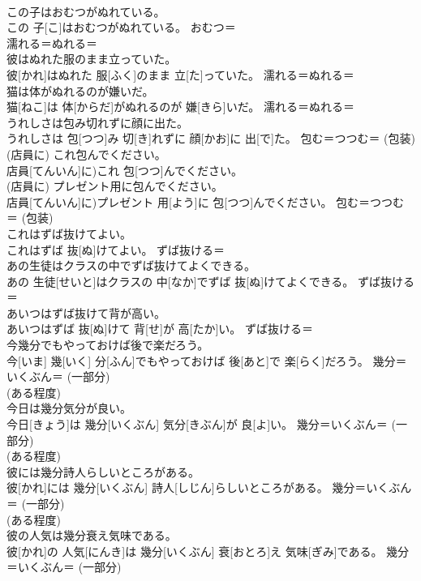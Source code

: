 \documentclass[8pt]{extreport}
\begin{document}
\begin{CJK}{UTF8}{min}
\\	この子はおむつがぬれている。	
\\	この 子[こ]はおむつがぬれている。	おむつ＝ 
\\	濡れる＝ぬれる＝ 
\\	彼はぬれた服のまま立っていた。	
\\	彼[かれ]はぬれた 服[ふく]のまま 立[た]っていた。	濡れる＝ぬれる＝ 
\\	猫は体がぬれるのが嫌いだ。	
\\	猫[ねこ]は 体[からだ]がぬれるのが 嫌[きら]いだ。	濡れる＝ぬれる＝ 
\\	うれしさは包み切れずに顔に出た。	
\\	うれしさは 包[つつ]み 切[き]れずに 顔[かお]に 出[で]た。	包む＝つつむ＝ (包装) 
\\	(店員に) これ包んでください。	
\\	店員[てんいん]に)これ 包[つつ]んでください。	
\\	(店員に) プレゼント用に包んでください。	
\\	店員[てんいん]に)プレゼント 用[よう]に 包[つつ]んでください。	包む＝つつむ＝ (包装) 
\\	これはずば抜けてよい。	
\\	これはずば 抜[ぬ]けてよい。	ずば抜ける＝ 
\\	あの生徒はクラスの中でずば抜けてよくできる。	
\\	あの 生徒[せいと]はクラスの 中[なか]でずば 抜[ぬ]けてよくできる。	ずば抜ける＝ 
\\	あいつはずば抜けて背が高い。	
\\	あいつはずば 抜[ぬ]けて 背[せ]が 高[たか]い。	ずば抜ける＝ 
\\	今幾分でもやっておけば後で楽だろう。	
\\	今[いま] 幾[いく] 分[ふん]でもやっておけば 後[あと]で 楽[らく]だろう。	幾分＝いくぶん＝ (一部分) 
\\	(ある程度) 
\\	今日は幾分気分が良い。	
\\	今日[きょう]は 幾分[いくぶん] 気分[きぶん]が 良[よ]い。	幾分＝いくぶん＝ (一部分) 
\\	(ある程度) 
\\	彼には幾分詩人らしいところがある。	
\\	彼[かれ]には 幾分[いくぶん] 詩人[しじん]らしいところがある。	幾分＝いくぶん＝ (一部分) 
\\	(ある程度) 
\\	彼の人気は幾分衰え気味である。	
\\	彼[かれ]の 人気[にんき]は 幾分[いくぶん] 衰[おとろ]え 気味[ぎみ]である。	幾分＝いくぶん＝ (一部分) 

\end{CJK}
\end{document}

